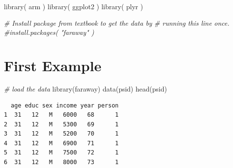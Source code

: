 \documentclass[
  letterpaper,
  DIV=11,
  numbers=noendperiod]{scrreprt}
\newenvironment{Shaded}{\begin{snugshade}}{\end{snugshade}}
\newcommand{\AttributeTok}[1]{\textcolor[rgb]{0.49,0.56,0.16}{#1}}
\newcommand{\CommentTok}[1]{\textcolor[rgb]{0.38,0.63,0.69}{\textit{#1}}}
\newcommand{\DecValTok}[1]{\textcolor[rgb]{0.25,0.63,0.44}{#1}}
\newcommand{\FunctionTok}[1]{\textcolor[rgb]{0.02,0.16,0.49}{#1}}
\newcommand{\NormalTok}[1]{\textcolor[rgb]{0.00,0.44,0.13}{#1}}
\newcommand{\OtherTok}[1]{\textcolor[rgb]{0.00,0.44,0.13}{#1}}
\newcommand{\SpecialCharTok}[1]{\textcolor[rgb]{0.25,0.44,0.63}{#1}}
\begin{document}
\begin{Shaded}
\begin{Highlighting}[]
\FunctionTok{library}\NormalTok{( arm )}
\FunctionTok{library}\NormalTok{( ggplot2 )}
\FunctionTok{library}\NormalTok{( plyr )}

\CommentTok{\# Install package from textbook to get the data by }
\CommentTok{\# running this line once.}
\CommentTok{\#install.packages( "faraway" )}
\end{Highlighting}
\end{Shaded}

\hypertarget{first-example}{%
\section{First Example}\label{first-example}}

\begin{Shaded}
\begin{Highlighting}[]
\CommentTok{\# load the data}
\FunctionTok{library}\NormalTok{(faraway)}
\FunctionTok{data}\NormalTok{(psid)}
\FunctionTok{head}\NormalTok{(psid)}
\end{Highlighting}
\end{Shaded}

\begin{verbatim}
  age educ sex income year person
1  31   12   M   6000   68      1
2  31   12   M   5300   69      1
3  31   12   M   5200   70      1
4  31   12   M   6900   71      1
5  31   12   M   7500   72      1
6  31   12   M   8000   73      1
\end{verbatim}

\begin{Shaded}
\end{Shaded}
\end{document}
